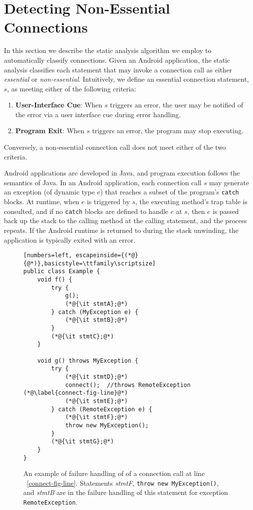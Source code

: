 \section{Detecting Non-Essential Connections}
\label{sec:analysis}

In this section we describe the static analysis algorithm we employ to
automatically classify connections.  Given an Android application, the
static analysis classifies each statement that may invoke a
connection call as either {\it essential} or {\it non-essential}.
Intuitively, we define an essential connection statement, $s$, as
meeting either of the following criteria:

\begin{enumerate}
\item{\bf User-Interface Cue}: When $s$ triggers an error, the user
may be notified of the error via a user interface cue during error
handling.
\item {\bf Program Exit}: When $s$ triggers an error, the program 
   may stop executing.  
\end{enumerate}

\noindent Conversely, a non-essential connection call does not meet
either of the two criteria.  

Android applications are developed in Java, and program execution
follows the semantics of Java. In an Android application, each
connection call $s$ may generate an exception (of dynamic type $e$)
that reaches a subset of the program's \lstinline!catch! blocks.  At
runtime, when $e$ is triggered by $s$, the executing method's trap
table is consulted, and if no \lstinline!catch! blocks are defined to
handle $e$ at $s$, then $e$ is passed back up the stack to the
calling method at the calling statement, and the process repeats.  If
the Android runtime is returned to during the stack unwinding, the
application is typically exited with an error.  


\begin{figure}
\begin{lstlisting}[numbers=left, escapeinside={(*@}{@*)},basicstyle=\ttfamily\scriptsize]
public class Example {
    void f() {
        try {
            g();
            (*@{\it stmtA};@*)
        } catch (MyException e) {
            (*@{\it stmtB};@*)
        }
        (*@{\it stmtC};@*)
    }

    void g() throws MyException {
        try {
            (*@{\it stmtD};@*)
            connect();  //throws RemoteException (*@\label{connect-fig-line}@*)
            (*@{\it stmtE};@*)
        } catch (RemoteException e) {
            (*@{\it stmtF};@*)
            throw new MyException();            
        }        
        (*@{\it stmtG};@*)
    }
}
\end{lstlisting}
\caption{\label{fig:failure-handling}An example of failure handling of
  of a connection call at line ~\ref{connect-fig-line}.  Statements
  {\it stmtF}, \lstinline!throw new MyException()!, and {\it stmtB}
  are in the failure handling of this statement for exception \lstinline!RemoteException!.
}
\end{figure}

